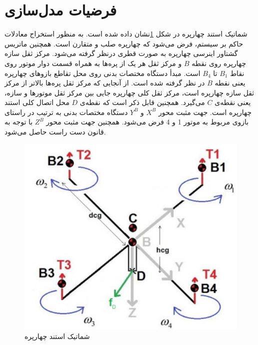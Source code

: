 \section{فرضیات مدل‌سازی}
شماتیک استند چهارپره در شكل \ref{QuadAssum}نشان داده شده است. به ‌منظور استخراج معادلات حاکم بر سیستم، 
فرض می‌شود که چهارپره صلب و متقارن است. همچنین ماتریس گشتاور اینرسی چهارپره به صورت قطری درنظر گرفته می‌شود. مرکز ثقل سازه چهارپره روی نقطه $B$ و مرکز ثقل هر یک از پره‌ها به همراه قسمت دوار موتور روی نقاط 
$B_1$
تا
$B_4$
است. مبدأ دستگاه مختصات بدنی روی محل تقاطع بازوهای چهارپره یعنی نقطه 
$B$
در نظر گرفته شده است. از آنجایی ‌که مرکز ثقل پره‌ها بالاتر از مرکز ثقل سازه چهارپره است، مرکز ثقل کلی چهارپره جایی بین مرکز ثقل موتورها و سازه، یعنی نقطه‌ی 
$C$
می‌گیرد. همچنین قابل ذکر است که نقطه‌ی
$D$
محل اتصال کلی استند چهارپره است. جهت مثبت محور 
$X^B$
و
$Y^B$
دستگاه مختصات بدنی به ترتیب در راستای بازوی مربوط به موتور 1 و 4 فرض می‌شود. همچنین جهت مثبت محور
$Z^B$
با توجه به قانون دست راست حاصل می‌شود.
\begin{figure}[H]\label{QuadAssum}
	\includegraphics[width=12cm]{../../Figures/Forces/StandAssumations.jpg}
	\centering
	\caption{شماتیک استند چهارپره \cite{Abeshtan}}
\end{figure}
 
